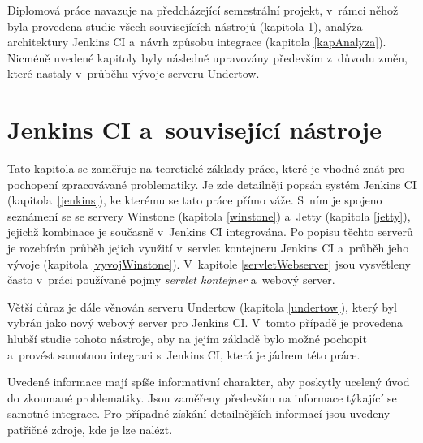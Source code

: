     Diplomová práce navazuje na předcházející semestrální projekt, v~rámci něhož byla provedena studie všech
    souvisejících nástrojů (kapitola \ref{kapJenkins}),  analýza architektury Jenkins CI
    a~návrh způsobu integrace (kapitola \ref{kapAnalyza}). Nicméně uvedené kapitoly byly následně
    upravovány především z~důvodu změn, které nastaly v~průběhu vývoje serveru Undertow.
    

    



\chapter{Jenkins CI a~související nástroje} \label{kapJenkins}
    Tato kapitola se zaměřuje na teoretické základy práce, které je vhodné znát pro pochopení zpracovávané problematiky.
    Je zde detailněji popsán systém Jenkins CI (kapitola~\ref{jenkins}), ke kterému se tato práce přímo váže. S~ním je spojeno seznámení
    se se servery Winstone (kapitola \ref{winstone}) a~Jetty (kapitola \ref{jetty}), jejichž kombinace je současně v~Jenkins CI integrována.
    Po popisu těchto serverů je rozebírán průběh jejich využití v~servlet kontejneru Jenkins CI a~průběh jeho vývoje (kapitola \ref{vyvojWinstone}). 
    V~kapitole \ref{servletWebserver} jsou vysvětleny často v~práci používané pojmy \emph{servlet kontejner} a~webový server.

    Větší důraz je dále věnován serveru Undertow (kapitola \ref{undertow}), který byl vybrán jako nový webový server pro Jenkins CI. V~tomto případě je provedena hlubší studie
    tohoto nástroje, aby na jejím základě bylo možné pochopit a~provést samotnou integraci s~Jenkins CI, která je jádrem této práce. 

    Uvedené informace mají spíše informativní charakter, aby poskytly ucelený úvod do zkoumané problematiky. Jsou zaměřeny především na informace týkající se samotné
    integrace. Pro případné získání detailnějších informací jsou uvedeny patřičné zdroje, kde je lze nalézt.

